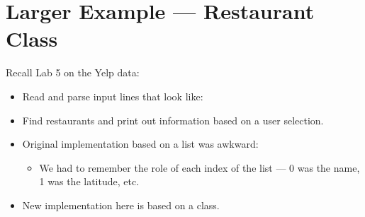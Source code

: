 \documentclass[letterpaper,10pt,english]{sphinxmanual}
\begin{document}
\section{Larger Example — Restaurant Class}
\label{\detokenize{lecture_notes/lec19_classes2:larger-example-restaurant-class}}
Recall Lab 5 on the Yelp data:
\begin{itemize}
\item {} 
Read and parse input lines that look like:

\begin{sphinxVerbatim}[commandchars=\\\{\}]
      \PYGZbs{}
\end{sphinxVerbatim}

\item {} 
Find restaurants and print out information based on a user selection.

\item {} 
Original implementation based on a list was awkward:
\begin{itemize}
\item {} 
We had to remember the role of each index of the list — 0 was the
name, 1 was the latitude, etc.

\end{itemize}

\item {} 
New implementation here is based on a class.

\end{itemize}
\end{document}
